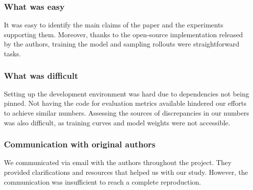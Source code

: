 \subsubsection*{What was easy}

It was easy to identify the main claims of the paper and the experiments supporting them.
Moreover, thanks to the open-source implementation released by the authors, training the model and sampling rollouts were straightforward tasks.

\subsubsection*{What was difficult}

Setting up the development environment was hard due to dependencies not being pinned.
Not having the code for evaluation metrics available hindered our efforts to achieve similar numbers.
Assessing the sources of discrepancies in our numbers was also difficult, as training curves and model weights were not accessible.

\subsubsection*{Communication with original authors}

We communicated via email with the authors throughout the project.
They provided clarifications and resources that helped us with our study.
However, the communication was insufficient to reach a complete reproduction.
